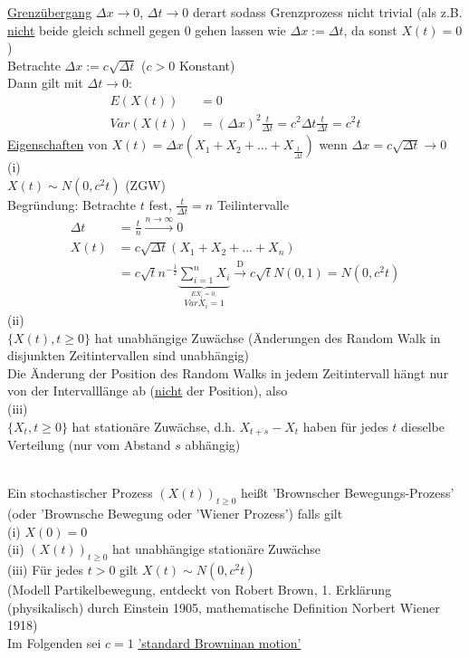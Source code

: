 \documentclass[a4paper,openany]{book}
\theoremstyle{mytheoremstyle}
\theoremstyle{mytheoremstyle2}
\begin{document}
\underline{Grenzübergang} $\Delta x\to 0$, $\Delta t\to 0$ derart sodass Grenzprozess nicht trivial (als z.B. \underline{nicht} beide gleich schnell gegen 0 gehen lassen wie $\Delta x:=\Delta t$, da sonst $X(t)=0$) \\
Betrachte $\Delta x:=c \sqrt{\Delta t}$ ($c>0$ Konstant)\\
Dann gilt mit $\Delta t\to 0$:
\begin{align*}
  E(X(t))&=0 \\
  Var(X(t))&=(\Delta x)^2 \frac{t}{\Delta t}=c^2\Delta t \frac{t}{\Delta t}=c^2t
\end{align*}
\underline{Eigenschaften} von $X(t)=\Delta x(X_1+X_2+...+X _{\frac{t}{\Delta t}})$ wenn $\Delta x=c \sqrt{\Delta t}\to0$\\
(i)\\
$X(t)\sim N(0,c^2t)$ (ZGW)\\
Begründung: Betrachte $t$ fest, $\frac{t}{\Delta t}=n$ Teilintervalle
\begin{align*}
  \Delta t&=\frac{t}{n}\overset{n\to \infty }\longrightarrow 0 \\
  X(t)&=c \sqrt{\Delta t}(X_1+X_2+...+X_n)\\
      &=c \sqrt{t}n^{-\frac{1}{2}}\underbrace{\sum_{i=1}^{n}{X_i}}_{\stackrel{EX_i=0,}{VarX_i=1}}\overset{\text{D}}\to c \sqrt{t}N(0,1)=N(0,c^2t)
\end{align*}
(ii) \\
$\{X(t),t \geq 0\} $ hat unabhängige Zuwächse (Änderungen des Random Walk in disjunkten Zeitintervallen sind unabhängig) \\
Die Änderung der Position des Random Walks in jedem Zeitintervall hängt nur von der Intervalllänge ab (\underline{nicht} der Position), also \\
(iii)\\
$\{X_t,t \geq 0\} $ hat stationäre Zuwächse, d.h. $X _{t+s}-X_t$ haben für jedes $t$ dieselbe Verteilung (nur vom Abstand $s$ abhängig) \\\\
\begin{defi}{16.2}{}
  Ein stochastischer Prozess $(X(t))_{t \geq 0} $ heißt 'Brownscher Bewegungs-Prozess' (oder 'Brownsche Bewegung oder 'Wiener Prozess') falls gilt \\
  (i) $X(0)=0 $\\
  (ii) $(X(t))_{t \geq 0} $ hat unabhängige stationäre Zuwächse \\
  (iii) Für jedes $t > 0 $ gilt $X(t)\sim N(0,c^2t)$ \\
  (Modell Partikelbewegung, entdeckt von Robert Brown, 1. Erklärung (physikalisch) durch Einstein 1905, mathematische Definition Norbert Wiener 1918)\\
  Im Folgenden sei $c=1 $ \underline{'standard Browninan motion'}
\end{defi}
\end{document}
